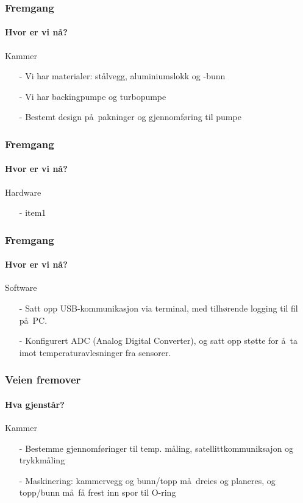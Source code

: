 \documentclass{beamer}
\begin{document}
  \begin{frame}
    \frametitle{Fremgang}
    \framesubtitle{Hvor er vi n\aa ?}
    \begin{block}{Kammer}
    	\begin{itemize}
    		\item[-] Vi har materialer: st\aa lvegg, aluminiumslokk og -bunn
    		\item[-] Vi har backingpumpe og turbopumpe
    		\item[-] Bestemt design p\aa\ pakninger og gjennomf\o ring til pumpe
    	\end{itemize}
    \end{block}
    \end{frame}
    
    \begin{frame}
    	\frametitle{Fremgang}
    	\framesubtitle{Hvor er vi n\aa ?}
    	\begin{block}{Hardware}
    		\begin{itemize}
    			\item[-] item1
    		\end{itemize}
    	\end{block}
    \end{frame}
    
    \begin{frame}
    	\frametitle{Fremgang}
    	\framesubtitle{Hvor er vi n\aa ?}
    	\begin{block}{Software}
    		\begin{itemize}
    			\item[-] Satt opp USB-kommunikasjon via terminal, med tilh\o rende logging til fil p\aa\ PC.
    			\item[-] Konfigurert ADC (Analog Digital Converter), og satt opp st\o tte for \aa\ ta imot temperaturavlesninger fra sensorer.
    		\end{itemize}
    	\end{block}
    \end{frame}

  \begin{frame}
    \frametitle{Veien fremover}
    \framesubtitle{Hva gjenst\aa r?}
        \begin{block}{Kammer}
    	\begin{itemize}
    		\item[-] Bestemme gjennomf\o ringer til temp. m\aa ling, satellittkommuniksajon og trykkm\aa ling
    		\item[-] Maskinering: kammervegg og bunn/topp m\aa\ dreies og planeres, og topp/bunn m\aa\ få frest inn spor til O-ring
    	\end{itemize}
    \end{block}
    \end{frame}
    
\end{document}
